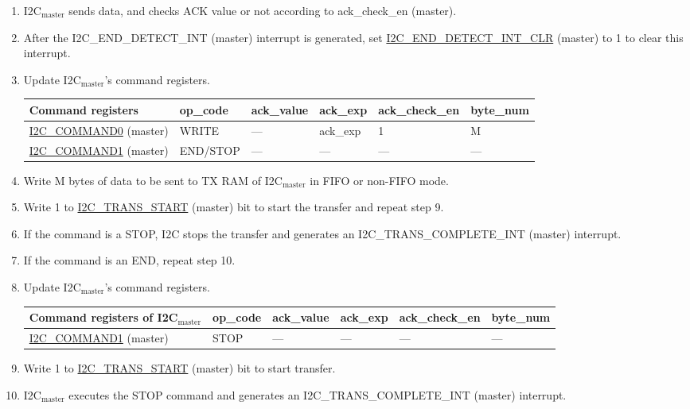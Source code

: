 \documentclass[main\_\_EN.tex]{subfiles}
\begin{document}
\begin{enumerate}
\item I2C$_\text{master}$ sends data, and checks ACK value or not according to ack\_check\_en (master).

\item After the I2C\_END\_DETECT\_INT (master) interrupt is generated, set \hyperref[fielddesc:I2CENDDETECTINTCLR]{I2C\_END\_DETECT\_INT\_CLR} (master) to 1 to clear this interrupt.
\item Update I2C$_\text{master}$'s command registers.
\begin{longtable}{ | p{4cm} | p{2cm} | p{2cm} | p{2cm} |p{2cm} | p{2cm} |}
\hline\rowcolor{lightgray}
Command registers& op\_code & ack\_value&ack\_exp&ack\_check\_en&byte\_num  \\ \hline
\hyperref[fielddesc:I2CCOMMAND0]{I2C\_COMMAND0} (master)& WRITE& ---&ack\_exp&1&M  \\ \hline
\hyperref[fielddesc:I2CCOMMAND1]{I2C\_COMMAND1} (master)& END/STOP& ---&---&---&---  \\ \hline
\end{longtable}
\item Write M bytes of data to be sent to TX RAM of I2C$_\text{master}$ in FIFO or non-FIFO mode.
\item Write 1 to \hyperref[fielddesc:I2CTRANSSTART]{I2C\_TRANS\_START} (master) bit to start the transfer and repeat step 9.
\item If the command is a STOP, I2C stops the transfer and generates an I2C\_TRANS\_COMPLETE\_INT (master) interrupt.
\item If the command is an END, repeat step 10.
\item Update I2C$_\text{master}$'s command registers.
\begin{longtable}{ | p{4cm} | p{2cm} | p{2cm} | p{2cm} |p{2cm} | p{2cm} |}
\hline\rowcolor{lightgray}
Command registers of I2C$_\text{master}$& op\_code & ack\_value&ack\_exp&ack\_check\_en&byte\_num  \\ \hline
\hyperref[fielddesc:I2CCOMMAND1]{I2C\_COMMAND1} (master)& STOP& ---&---&---&---  \\ \hline
\end{longtable}
\item Write 1 to \hyperref[fielddesc:I2CTRANSSTART]{I2C\_TRANS\_START} (master) bit to start transfer.
\item I2C$_\text{master}$ executes the STOP command and generates an I2C\_TRANS\_COMPLETE\_INT (master) interrupt.

\end{enumerate}
\end{document}
